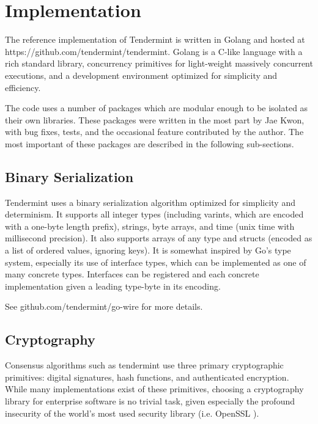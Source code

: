 \chapter{Implementation}
\label{ch:implementation}

The reference implementation of Tendermint is written in Golang \cite{golang} and hosted at https://github.com/tendermint/tendermint.
Golang is a C-like language with a rich standard library, concurrency primitives for light-weight massively concurrent executions,
and a development environment optimized for simplicity and efficiency.

The code uses a number of packages which are modular enough to be isolated as their own libraries.
These packages were written in the most part by Jae Kwon, with bug fixes, tests, and the occasional feature contributed by the author.
The most important of these packages are described in the following sub-sections.

\section{Binary Serialization}

Tendermint uses a binary serialization algorithm optimized for simplicity and determinism.
It supports all integer types (including varints, which are encoded with a one-byte length prefix),
strings, byte arrays, and time (unix time with millisecond precision).
It also supports arrays of any type and structs (encoded as a list of ordered values, ignoring keys).
It is somewhat inspired by Go's type system, especially its use of interface types, 
which can be implemented as one of many concrete types.
Interfaces can be registered and each concrete implementation given a leading type-byte in its encoding.

See github.com/tendermint/go-wire for more details.

\section{Cryptography}

Consensus algorithms such as tendermint use three primary cryptographic primitives: digital signatures, hash functions, and authenticated encryption.
While many implementations exist of these primitives, 
choosing a cryptography library for enterprise software is no trivial task, given especially the profound insecurity of the world's most used security library 
(i.e. OpenSSL \cite{openssl}).

